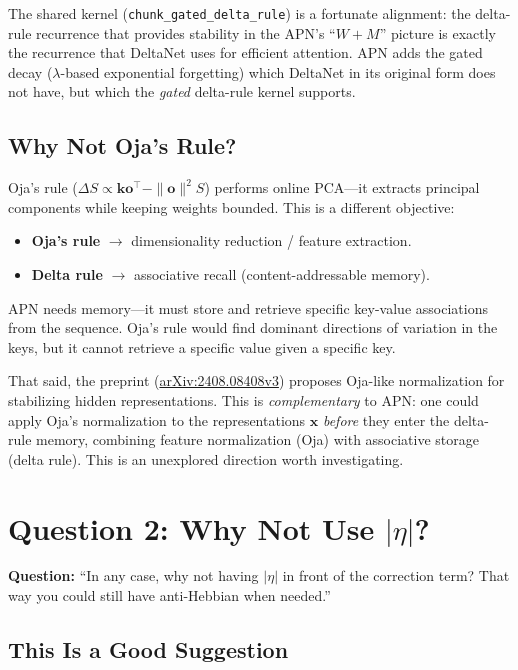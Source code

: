 \documentclass[11pt,a4paper]{article}
\begin{document}
The shared kernel (\texttt{chunk\_gated\_delta\_rule}) is a fortunate alignment: the delta-rule recurrence that provides stability in the APN's ``$W + M$'' picture is exactly the recurrence that DeltaNet uses for efficient attention.
APN adds the gated decay ($\lambda$-based exponential forgetting) which DeltaNet in its original form does not have, but which the \emph{gated} delta-rule kernel supports.

\subsection{Why Not Oja's Rule?}

Oja's rule ($\Delta S \propto \mathbf{k}\mathbf{o}^\top - \|\mathbf{o}\|^2 S$) performs online PCA---it extracts principal components while keeping weights bounded.
This is a different objective:
\begin{itemize}
\item \textbf{Oja's rule} $\to$ dimensionality reduction / feature extraction.
\item \textbf{Delta rule} $\to$ associative recall (content-addressable memory).
\end{itemize}
APN needs memory---it must store and retrieve specific key-value associations from the sequence.
Oja's rule would find dominant directions of variation in the keys, but it cannot retrieve a specific value given a specific key.

That said, the preprint (\href{https://arxiv.org/abs/2408.08408v3}{arXiv:2408.08408v3}) proposes Oja-like normalization for stabilizing hidden representations.
This is \emph{complementary} to APN: one could apply Oja's normalization to the representations $\mathbf{x}$ \emph{before} they enter the delta-rule memory, combining feature normalization (Oja) with associative storage (delta rule).
This is an unexplored direction worth investigating.

\section{Question 2: Why Not Use $|\eta|$?}

\textbf{Question:} ``In any case, why not having $|\eta|$ in front of the correction term? That way you could still have anti-Hebbian when needed.''

\subsection{This Is a Good Suggestion}
\end{document}
